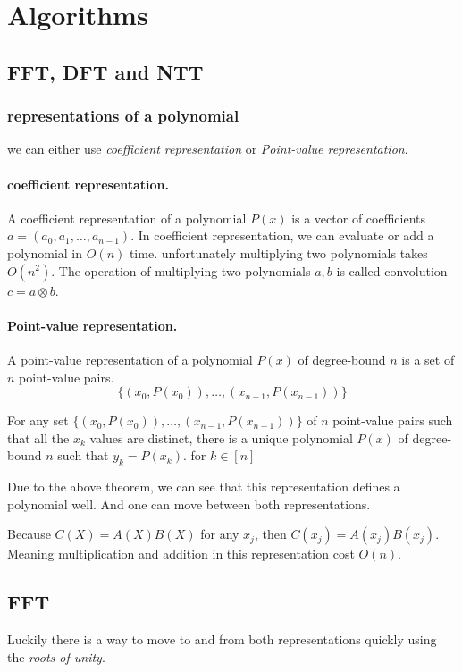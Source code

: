 
\chapter{Algorithms}
\section{FFT, DFT and NTT}
\subsection{representations of a polynomial}
we can either use \emph{coefficient representation} or \emph{Point-value representation}.

\subsubsection*{coefficient representation.}
A coefficient representation of a polynomial $P(x)$ is a vector of coefficients 
$a=(a_0,a_1,\dots, a_{n-1})$.
In coefficient representation, we can evaluate or add a polynomial in $O(n)$ time. 
unfortunately multiplying two polynomials takes $O(n^2)$.
The operation of multiplying two polynomials $a,b$ is called convolution $c=a\otimes b$.


\subsubsection*{Point-value representation.}
A point-value representation of a polynomial $P(x)$ of degree-bound $n$ is a set of $n$ point-value pairs.
$$ \{ (x_0,P(x_0)),\dots , (x_{n-1}, P(x_{n-1})) \}$$

\begin{theorem}
  For any set $ \{ (x_0,P(x_0)),\dots , (x_{n-1}, P(x_{n-1})) \}$ of $n$
  point-value pairs such that all the $x_k$ values are distinct,
  there is a unique polynomial $P(x)$ of degree-bound $n$ such that
  $y_k = P(x_k)$. for $k\in[n]$ 
\end{theorem}

Due to the above theorem, we can see that this representation defines a polynomial well. 
And one can move between both representations.

Because $C(X)=A(X)B(X)$ for any $x_j$, then $C(x_j)=A(x_j)B(x_j)$. Meaning 
multiplication and addition in this representation cost $O(n)$.
 
\section*{FFT}
Luckily there is a way to move to and from both representations quickly using the \emph{roots of unity}.

